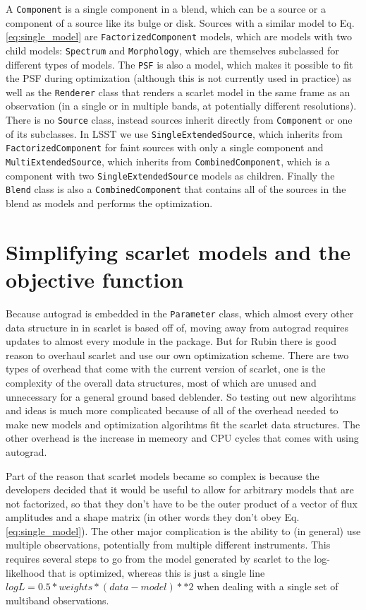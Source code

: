 \documentclass[DM,authoryear,toc]{lsstdoc}
\begin{document}
A \texttt{Component} is a single component in a blend, which can be a source or a component of a source like its bulge or disk. Sources with a similar model to Eq. \ref{eq:single_model} are \texttt{FactorizedComponent} models, which are models with two child models: \texttt{Spectrum} and \texttt{Morphology}, which are themselves subclassed for different types of models. The \texttt{PSF} is also a model, which makes it possible to fit the PSF during optimization (although this is not currently used in practice) as well as the \texttt{Renderer} class that renders a scarlet model in the same frame as an observation (in a single or in multiple bands, at potentially different resolutions). There is no \texttt{Source} class, instead sources inherit directly from \texttt{Component} or one of its subclasses. In LSST we use \texttt{SingleExtendedSource}, which inherits from \texttt{FactorizedComponent} for faint sources with only a single component and \texttt{MultiExtendedSource}, which inherits from \texttt{CombinedComponent}, which is a component with two \texttt{SingleExtendedSource} models as children. Finally the \texttt{Blend} class is also a \texttt{CombinedComponent} that contains all of the sources in the blend as models and performs the optimization.

\section{Simplifying scarlet models and the objective function}

Because autograd is embedded in the \texttt{Parameter} class, which almost every other data structure in in scarlet is based off of, moving away from autograd requires updates to almost every module in the package. But for Rubin there is good reason to overhaul scarlet and use our own optimization scheme. There are two types of overhead that come with the current version of scarlet, one is the complexity of the overall data structures, most of which are unused and unnecessary for a general ground based deblender. So testing out new algorihtms and ideas is much more complicated because of all of the overhead needed to make new models and optimization algorihtms fit the scarlet data structures. The other overhead is the increase in memeory and CPU cycles that comes with using autograd.

Part of the reason that scarlet models became so complex is because the developers decided that it would be useful to allow for arbitrary models that are not factorized, so that they don't have to be the outer product of a vector of flux amplitudes and a shape matrix (in other words they don't obey Eq. \ref{eq:single_model}). The other major complication is the ability to (in general) use multiple observations, potentially from multiple different instruments. This requires several steps to go from the model generated by scarlet to the log-likelhood that is optimized, whereas this is just a single line $logL = 0.5*weights*(data-model)**2$ when dealing with a single set of multiband observations.
\end{document}
